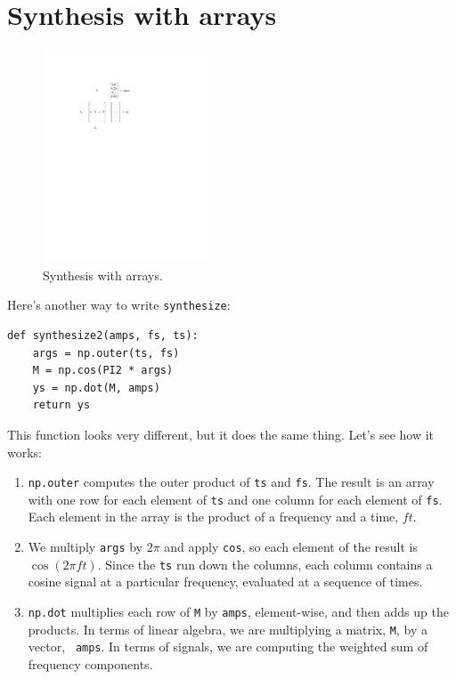 \documentclass[12pt]{book}
\begin{document}
\section{Synthesis with arrays}
\label{synthesis}

\begin{figure}
\centerline{\includegraphics[height=2.5in]{figs/diagram1.pdf}}
\caption{Synthesis with arrays.}
\label{fig.synthesis}
\end{figure}

Here's another way to write {\tt synthesize}:

\begin{verbatim}
def synthesize2(amps, fs, ts):
    args = np.outer(ts, fs)
    M = np.cos(PI2 * args)
    ys = np.dot(M, amps)
    return ys
\end{verbatim}

This function looks very different, but it does the same thing.
Let's see how it works:

\begin{enumerate}

\item {\tt np.outer} computes the outer product of {\tt ts} and
  {\tt fs}.  The result is an array with one row for each element
  of {\tt ts} and one column for each element of {\tt fs}.  Each
  element in the array is the product of a frequency and a time, $f
  t$.

\item We multiply {\tt args} by $2 \pi$ and apply {\tt cos}, so each
  element of the result is $\cos (2 \pi f t)$.  Since the {\tt ts} run
  down the columns, each column contains a cosine signal at a
  particular frequency, evaluated at a sequence of times.

\item {\tt np.dot} multiplies each row of {\tt M} by {\tt amps},
  element-wise, and then adds up the products.  In terms of linear
  algebra, we are multiplying a matrix, {\tt M}, by a vector, {\tt
    amps}.  In terms of signals, we are computing the weighted sum
  of frequency components.

\end{enumerate}
\end{document}
